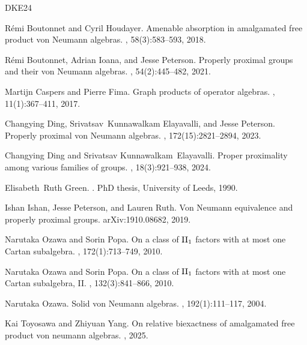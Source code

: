 \documentclass[a4paper, 11pt, reqno]{amsart}
\numberwithin{equation}{section}
\theoremstyle{plain}
\theoremstyle{remark}
\theoremstyle{definition}
\begin{document}
\begin{thebibliography}{DKE24}

R\'emi Boutonnet and Cyril Houdayer.
\newblock Amenable absorption in amalgamated free product von {N}eumann algebras.
, 58(3):583--593, 2018.

R\'emi Boutonnet, Adrian Ioana, and Jesse Peterson.
\newblock Properly proximal groups and their von {N}eumann algebras.
, 54(2):445--482, 2021.

Martijn Caspers and Pierre Fima.
\newblock Graph products of operator algebras.
, 11(1):367--411, 2017.

Changying Ding, Srivatsav~Kunnawalkam Elayavalli, and Jesse Peterson.
\newblock Properly proximal von {N}eumann algebras.
, 172(15):2821--2894, 2023.

Changying Ding and Srivatsav Kunnawalkam~Elayavalli.
\newblock Proper proximality among various families of groups.
, 18(3):921--938, 2024.

Elisabeth~Ruth Green.
.
\newblock PhD thesis, University of Leeds, 1990.

Ishan Ishan, Jesse Peterson, and Lauren Ruth.
\newblock Von {Neumann} equivalence and properly proximal groups.
\newblock arXiv:1910.08682, 2019.

Narutaka Ozawa and Sorin Popa.
\newblock On a class of {${\rm II}_1$} factors with at most one {C}artan subalgebra.
, 172(1):713--749, 2010.

Narutaka Ozawa and Sorin Popa.
\newblock On a class of {${\rm II}_1$} factors with at most one {C}artan subalgebra, {II}.
, 132(3):841--866, 2010.

Narutaka Ozawa.
\newblock Solid von {N}eumann algebras.
, 192(1):111--117, 2004.

Kai Toyosawa and Zhiyuan Yang.
\newblock On relative biexactness of amalgamated free product von neumann algebras.
, 2025.

\end{thebibliography}
\end{document}
